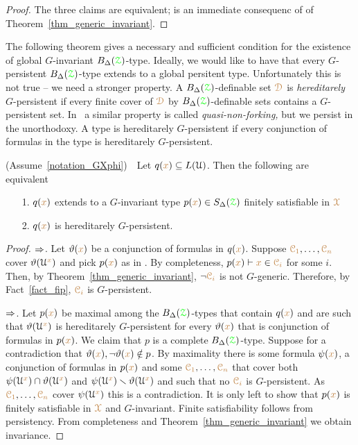 \begin{proof}
  The three claims are equivalent;  is an immediate consequenc of  of Theorem~\ref{thm_generic_invariant}.
\end{proof}

The following theorem gives a necessary and sufficient condition for the  existence of global $G$-invariant $B_\Delta({{\color{green}\EuScript Z}})$-type.
Ideally, we would like to have that every $G$-persistent $B_\Delta({{\color{green}\EuScript Z}})$-type extends to a global persitent type.
Unfortunately this is not true -- we need a stronger property.
A $B_\Delta({{\color{green}\EuScript Z}})$-definable set ${\color{brown}\EuScript D}$ is \emph{hereditarely\/} $G$-persistent if every finite cover of ${\color{brown}\EuScript D}$ by $B_\Delta({{\color{green}\EuScript Z}})$-definable sets contains a $G$-persistent set.
In~\cite{CK} a similar property is called \textit{quasi-non-forking,} but we persist in the unorthodoxy.
A type is hereditarely $G$-persistent if every conjunction of formulas in the type is hereditarely $G$-persistent.

\begin{theorem}\label{thm_generic_invariant2}
  (Assume~\ref{notation_GXphi})\ \  
  Let $q({\color{brown} x})\subseteq L(\EuScript U)$.
  Then the following are equivalent 
  \begin{itemize}
    \item[1.] $q({\color{brown} x})$ extends to a $G$-invariant type $p({\color{brown} x})\in S_\Delta({\color{green}\EuScript Z})$ finitely satisfiable in ${\color{brown}\EuScript X}$
    \item[2.] $q({\color{brown} x})$ is hereditarely $G$-persistent.
  \end{itemize}
\end{theorem}

\begin{proof}
  $\Rightarrow$.
  Let $\vartheta({\color{brown} x})$ be a conjunction of formulas in $q({\color{brown} x})$.
  Suppose ${\color{brown}\EuScript C_1},\dots,{\color{brown}\EuScript C_n}$ cover $\vartheta(\EuScript U^{\color{brown} x})$ and pick $p({\color{brown} x})$ as in .
  By completeness, $p({\color{brown} x})\vdash {\color{brown}x}\in{\color{brown}\EuScript C_i}$ for some $i$.
  Then, by Theorem~\ref{thm_generic_invariant}, $\neg{\color{brown}\EuScript C_i}$ is not $G$-generic.
  Therefore, by Fact~\ref{fact_fip}, ${\color{brown}\EuScript C_i}$ is $G$-persistent.

  $\Rightarrow$.
  Let $p({\color{brown} x})$ be maximal among the $B_\Delta({{\color{green}\EuScript Z}})$-types that contain $q({\color{brown} x})$ and are such that $\vartheta(\EuScript U^{\color{brown} x})$ is hereditarely $G$-persistent for every $\vartheta({\color{brown} x})$ that is conjunction of formulas in $p({\color{brown} x})$.
  We claim that $p$ is a complete $B_\Delta({{\color{green}\EuScript Z}})$-type.
  Suppose for a contradiction that $\vartheta({\color{brown} x}),\neg\vartheta({\color{brown} x})\notin p$.
  By maximality there is some formula $\psi({\color{brown} x})$, a conjunction of formulas in $p({\color{brown} x})$ and some ${\color{brown}\EuScript C_1},\dots,{\color{brown}\EuScript C_n}$ that cover both $\psi(\EuScript U^{\color{brown} x})\cap\vartheta(\EuScript U^{\color{brown} x})$ and $\psi(\EuScript U^{\color{brown} x})\smallsetminus\vartheta(\EuScript U^{\color{brown} x})$ and such that no ${\color{brown}\EuScript C_i}$ is $G$-persistent.
  As ${\color{brown}\EuScript C_1},\dots,{\color{brown}\EuScript C_n}$ cover $\psi(\EuScript U^{\color{brown} x})$ this is a contradiction.
  It is only left to show that $p({\color{brown} x})$ is finitely satisfiable in ${\color{brown}\EuScript X}$ and $G$-invariant.
  Finite satisfiability follows from persistency.
  From completeness and Theorem~\ref{thm_generic_invariant} we obtain invariance.
\end{proof}

